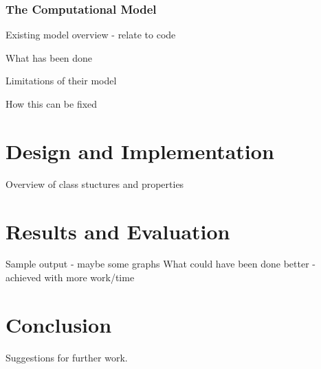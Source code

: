 \documentclass[authoryearcitations]{UoYCSproject}
\begin{document}
\subsection{The Computational Model}
\begin{framed}
Existing model overview - relate to code

What has been done

Limitations of their model

How this can be fixed
\end{framed}

\chapter{Design and Implementation}
\label{cha:Design and Implementation}
Overview of class stuctures and properties

\chapter{Results and Evaluation}
\label{cha:Results and Evaluation}
Sample output - maybe some graphs
What could have been done better - achieved with more work/time

\chapter{Conclusion}
\label{cha:Conclusion}
Suggestions for further work.


 
\end{document}
